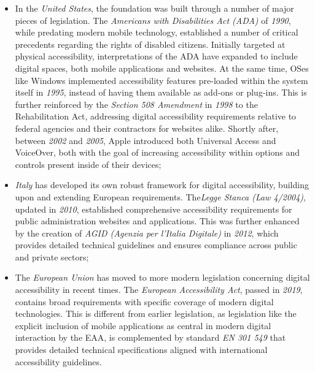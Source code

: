 \begin{itemize}
    \item In the \textit{United States}, the foundation was built through a number of major pieces of legislation. The \textit{Americans with Disabilities Act (ADA)} of \textit{1990}, while predating modern mobile technology, established a number of critical precedents regarding the rights of disabled citizens. Initially targeted at physical accessibility, interpretations of the ADA have expanded to include digital spaces, both mobile applications and websites. At the same time, OSes like Windows implemented accessibility features pre-loaded within the system itself in \textit{1995}, instead of having them available as add-ons or plug-ins. This is further reinforced by the \textit{Section 508 Amendment} in \textit{1998} to the Rehabilitation Act, addressing digital accessibility requirements relative to federal agencies and their contractors for websites alike. Shortly after, between \textit{2002} and \textit{2005}, Apple introduced both Universal Access and VoiceOver, both with the goal of increasing accessibility within options and controls present inside of their devices;
    
    \item \textit{Italy} has developed its own robust framework for digital accessibility, building upon and extending European requirements. The\textit{Legge Stanca (Law 4/2004)}, updated in \textit{2010}, established comprehensive accessibility requirements for public administration websites and applications. This was further enhanced by the creation of \textit{AGID (Agenzia per l'Italia Digitale)} in \textit{2012}, which provides detailed technical guidelines and ensures compliance across public and private sectors;
    
    \item The \textit{European Union} has moved to more modern legislation concerning digital accessibility in recent times. The \textit{European Accessibility Act}, passed in \textit{2019}, contains broad requirements with specific coverage of modern digital technologies. This is different from earlier legislation, as legislation like the explicit inclusion of mobile applications as central in modern digital interaction by the EAA, is complemented by standard \textit{EN 301 549} that provides detailed technical specifications aligned with international accessibility guidelines.
\end{itemize}

